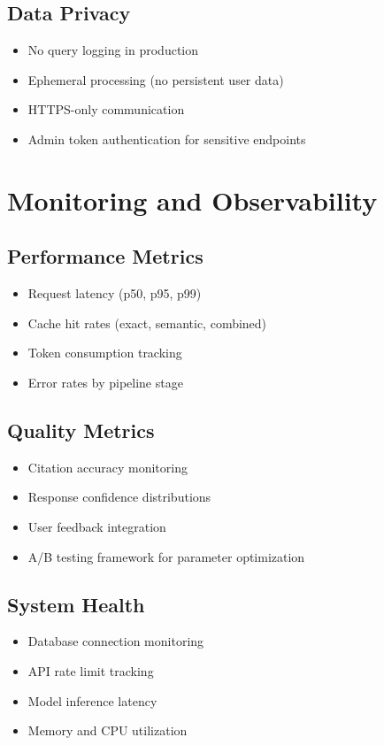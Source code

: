 \documentclass[11pt,a4paper]{article}
\begin{document}
\subsection{Data Privacy}
\begin{itemize}
    \item No query logging in production
    \item Ephemeral processing (no persistent user data)
    \item HTTPS-only communication
    \item Admin token authentication for sensitive endpoints
\end{itemize}

\section{Monitoring and Observability}

\subsection{Performance Metrics}
\begin{itemize}
    \item Request latency (p50, p95, p99)
    \item Cache hit rates (exact, semantic, combined)
    \item Token consumption tracking
    \item Error rates by pipeline stage
\end{itemize}

\subsection{Quality Metrics}
\begin{itemize}
    \item Citation accuracy monitoring
    \item Response confidence distributions
    \item User feedback integration
    \item A/B testing framework for parameter optimization
\end{itemize}

\subsection{System Health}
\begin{itemize}
    \item Database connection monitoring
    \item API rate limit tracking
    \item Model inference latency
    \item Memory and CPU utilization
\end{itemize}
\end{document}
